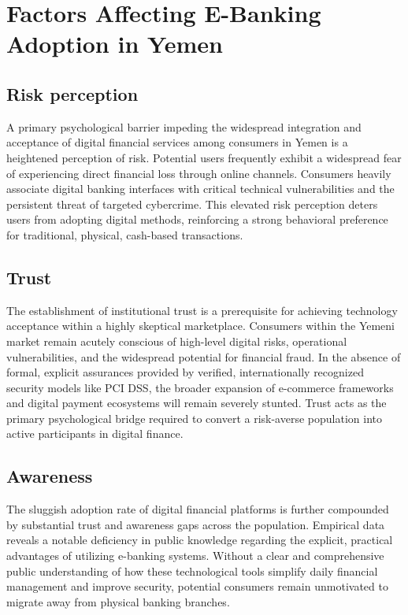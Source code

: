 \documentclass[12pt,a4paper,oneside]{report}
\begin{document}
	\section{Factors Affecting E-Banking Adoption in Yemen}
	
	\subsection{Risk perception}
	A primary psychological barrier impeding the widespread integration and acceptance of digital financial services among consumers in Yemen is a heightened perception of risk. Potential users frequently exhibit a widespread fear of experiencing direct financial loss through online channels. Consumers heavily associate digital banking interfaces with critical technical vulnerabilities and the persistent threat of targeted cybercrime. This elevated risk perception deters users from adopting digital methods, reinforcing a strong behavioral preference for traditional, physical, cash-based transactions.
	
	\subsection{Trust}
	The establishment of institutional trust is a prerequisite for achieving technology acceptance within a highly skeptical marketplace. Consumers within the Yemeni market remain acutely conscious of high-level digital risks, operational vulnerabilities, and the widespread potential for financial fraud. In the absence of formal, explicit assurances provided by verified, internationally recognized security models like PCI DSS, the broader expansion of e-commerce frameworks and digital payment ecosystems will remain severely stunted. Trust acts as the primary psychological bridge required to convert a risk-averse population into active participants in digital finance.
	
	\subsection{Awareness}
	The sluggish adoption rate of digital financial platforms is further compounded by substantial trust and awareness gaps across the population. Empirical data reveals a notable deficiency in public knowledge regarding the explicit, practical advantages of utilizing e-banking systems. Without a clear and comprehensive public understanding of how these technological tools simplify daily financial management and improve security, potential consumers remain unmotivated to migrate away from physical banking branches.
	
\end{document}
